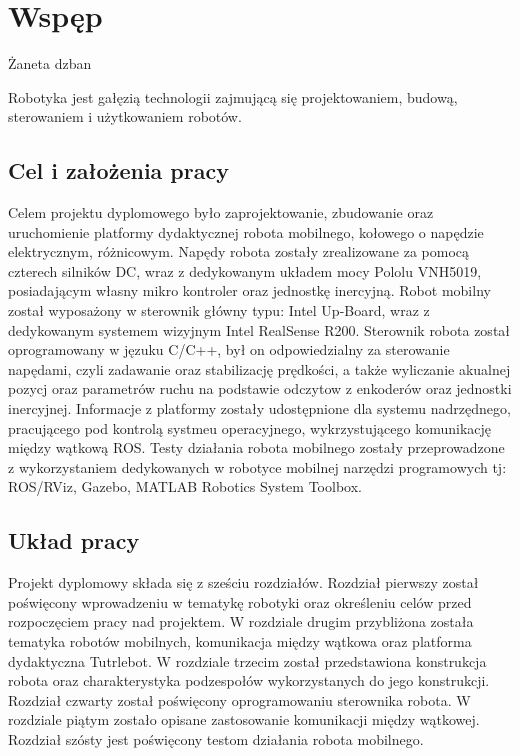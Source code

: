 \chapter{Wspęp}


Żaneta dzban 


Robotyka jest gałęzią technologii zajmującą się projektowaniem, budową, sterowaniem i użytkowaniem robotów. 

\section{Cel i założenia pracy}

Celem projektu dyplomowego było zaprojektowanie, zbudowanie oraz uruchomienie platformy dydaktycznej robota mobilnego, kołowego o napędzie elektrycznym, różnicowym. Napędy robota zostały zrealizowane za pomocą czterech silników DC, wraz z dedykowanym układem mocy Pololu VNH5019, posiadającym własny mikro kontroler oraz jednostkę inercyjną. Robot mobilny został wyposażony w sterownik główny typu: Intel Up-Board, wraz z dedykowanym systemem wizyjnym Intel RealSense R200. Sterownik robota został oprogramowany w jęzuku C/C++, był on odpowiedzialny za sterowanie napędami, czyli zadawanie oraz stabilizację prędkości, a także wyliczanie akualnej pozycj oraz parametrów ruchu na podstawie odczytow z enkoderów oraz jednostki inercyjnej. Informacje z platformy zostały udostępnione dla systemu nadrzędnego, pracującego pod kontrolą systmeu operacyjnego, wykrzystującego komunikację między wątkową ROS. Testy działania robota mobilnego zostały przeprowadzone z wykorzystaniem dedykowanych w robotyce mobilnej narzędzi programowych tj: ROS/RViz, Gazebo, MATLAB Robotics System Toolbox.

\section{Układ pracy}

Projekt dyplomowy składa się z sześciu rozdziałów. Rozdział pierwszy został poświęcony wprowadzeniu w tematykę robotyki oraz określeniu celów przed rozpoczęciem pracy nad projektem. W rozdziale drugim przybliżona została tematyka robotów mobilnych, komunikacja między wątkowa oraz platforma dydaktyczna Tutrlebot. W rozdziale trzecim został przedstawiona konstrukcja robota oraz charakterystyka podzespołów wykorzystanych do jego konstrukcji. Rozdział czwarty został poświęcony oprogramowaniu sterownika robota. W rozdziale piątym zostało opisane zastosowanie komunikacji między wątkowej. Rozdział szósty jest poświęcony testom działania robota mobilnego.
